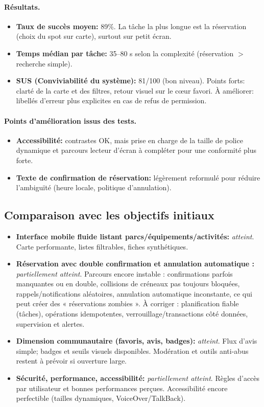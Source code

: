 \documentclass[12pt,a4paper]{article}
\begin{document}
\paragraph{Résultats.}
\begin{itemize}
  \item \textbf{Taux de succès moyen:} 89\%. La tâche la plus longue est la réservation (choix du spot sur carte), surtout sur petit écran.
  \item \textbf{Temps médian par tâche:} 35--80 s selon la complexité (réservation \(>\) recherche simple).
  \item \textbf{SUS (Conviviabilité du système):} 81/100 (bon niveau). Points forts: clarté de la carte et des filtres, retour visuel sur le cœur favori. À améliorer: libellés d’erreur plus explicites en cas de refus de permission.
\end{itemize}

\paragraph{Points d’amélioration issus des tests.}
\begin{itemize}
  \item \textbf{Accessibilité:} contrastes OK, mais prise en charge de la taille de police dynamique et parcours lecteur d’écran à compléter pour une conformité plus forte.
  \item \textbf{Texte de confirmation de réservation:} légèrement reformulé pour réduire l’ambiguïté (heure locale, politique d’annulation).
\end{itemize}

\subsection{Comparaison avec les objectifs initiaux}

\begin{itemize}
  \item \textbf{Interface mobile fluide listant parcs/équipements/activités:} \emph{atteint}. Carte performante, listes filtrables, fiches synthétiques.
\item \textbf{Réservation avec double confirmation et annulation automatique :} \emph{partiellement atteint}. Parcours encore instable : confirmations parfois manquantes ou en double, collisions de créneaux pas toujours bloquées, rappels/notifications aléatoires, annulation automatique inconstante, ce qui peut créer des « réservations zombies ». À corriger : planification fiable (tâches), opérations idempotentes, verrouillage/transactions côté données, supervision et alertes.
  \item \textbf{Dimension communautaire (favoris, avis, badges):} \emph{atteint}. Flux d’avis simple; badges et seuils visuels disponibles. Modération et outils anti-abus restent à prévoir si ouverture large.
  \item \textbf{Sécurité, performance, accessibilité:} \emph{partiellement atteint}. Règles d’accès par utilisateur et bonnes performances perçues. Accessibilité encore perfectible (tailles dynamiques, VoiceOver/TalkBack).
\end{itemize}
\end{document}
